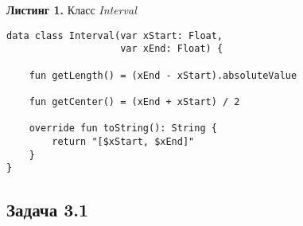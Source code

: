 \documentclass[a4paper, 12pt]{article}   	%
\begin{document}
    \textbf{Листинг 1.} Класс \textit{Interval}
    \begin{verbatim}
data class Interval(var xStart: Float,
                    var xEnd: Float) {

    fun getLength() = (xEnd - xStart).absoluteValue
    
    fun getCenter() = (xEnd + xStart) / 2
    
    override fun toString(): String {
        return "[$xStart, $xEnd]"
    }
}
    \end{verbatim}
    

\subsection{Задача 3.1}
\end{document}
